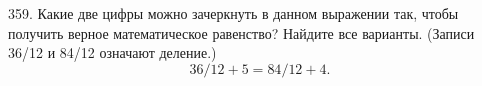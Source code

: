 359. Какие две цифры можно зачеркнуть в данном выражении так, чтобы получить верное математическое равенство? Найдите все варианты. (Записи 36/12 и 84/12 означают деление.)
$$ 36/12+5=84/12+4.$$
